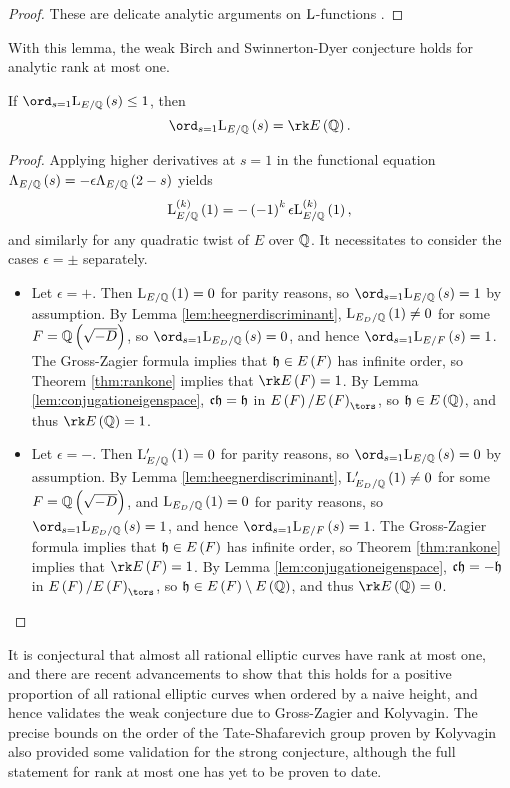\begin{proof}
These are delicate analytic arguments on $ \mathrm{L} $-functions \cite{Wal85, BFH90, MM91}.
\end{proof}

With this lemma, the weak Birch and Swinnerton-Dyer conjecture holds for analytic rank at most one.

\begin{theorem}
If $ \ord_{s = 1} \L_{E / \QQ}\br{s} \le 1 $, then
$$ \ord_{s = 1} \L_{E / \QQ}\br{s} = \rk E\br{\QQ}. $$
\end{theorem}

\begin{proof}
Applying higher derivatives at $ s = 1 $ in the functional equation $ \Lambda_{E / \QQ}\br{s} = -\epsilon\Lambda_{E / \QQ}\br{2 - s} $ yields
$$ \L_{E / \QQ}^{\br{k}}\br{1} = -\br{-1}^k\epsilon\L_{E / \QQ}^{\br{k}}\br{1}, $$
and similarly for any quadratic twist of $ E $ over $ \mathbb{Q} $. It necessitates to consider the cases $ \epsilon = \pm $ separately.
\begin{itemize}
\item Let $ \epsilon = + $. Then $ \L_{E / \QQ}\br{1} = 0 $ for parity reasons, so $ \ord_{s = 1} \L_{E / \QQ}\br{s} = 1 $ by assumption. By Lemma \ref{lem:heegnerdiscriminant}, $ \L_{E_D / \QQ}\br{1} \ne 0 $ for some $ F = \QQ\br{\sqrt{-D}} $, so $ \ord_{s = 1} \L_{E_D / \QQ}\br{s} = 0 $, and hence $ \ord_{s = 1} \L_{E / F}\br{s} = 1 $. The Gross-Zagier formula implies that $ \hhh \in E\br{F} $ has infinite order, so Theorem \ref{thm:rankone} implies that $ \rk E\br{F} = 1 $. By Lemma \ref{lem:conjugationeigenspace}, $ \mathfrak{c} \mathfrak{h} = \mathfrak{h} $ in $ E\br{F} / E\br{F}_{\tors} $, so $ \hhh \in E\br{\QQ} $, and thus $ \rk E\br{\QQ} = 1 $.
\item Let $ \epsilon = - $. Then $ \L'_{E / \QQ}\br{1} = 0 $ for parity reasons, so $ \ord_{s = 1} \L_{E / \QQ}\br{s} = 0 $ by assumption. By Lemma \ref{lem:heegnerdiscriminant}, $ \L'_{E_D / \QQ}\br{1} \ne 0 $ for some $ F = \QQ\br{\sqrt{-D}} $, and $ \L_{E_D / \QQ}\br{1} = 0 $ for parity reasons, so $ \ord_{s = 1} \L_{E_D / \QQ}\br{s} = 1 $, and hence $ \ord_{s = 1} \L_{E / F}\br{s} = 1 $. The Gross-Zagier formula implies that $ \hhh \in E\br{F} $ has infinite order, so Theorem \ref{thm:rankone} implies that $ \rk E\br{F} = 1 $. By Lemma \ref{lem:conjugationeigenspace}, $ \mathfrak{c} \mathfrak{h} = -\mathfrak{h} $ in $ E\br{F} / E\br{F}_{\tors} $, so $ \hhh \in E\br{F} \setminus E\br{\QQ} $, and thus $ \rk E\br{\QQ} = 0 $.
\end{itemize}
\end{proof}

It is conjectural that almost all rational elliptic curves have rank at most one, and there are recent advancements to show that this holds for a positive proportion of all rational elliptic curves when ordered by a naive height, and hence validates the weak conjecture due to Gross-Zagier and Kolyvagin. The precise bounds on the order of the Tate-Shafarevich group proven by Kolyvagin also provided some validation for the strong conjecture, although the full statement for rank at most one has yet to be proven to date.

\pagebreak

\printbibliography

